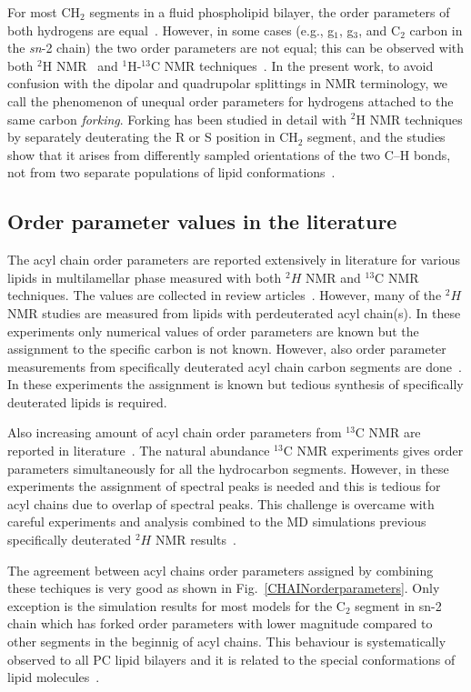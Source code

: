 \documentclass[aps,prl,superscriptaddress,twocolumn]{revtex4}
\begin{document}
For most CH$_2$ segments in a fluid phospholipid bilayer, the order parameters of both hydrogens are equal~\cite{seelig74,seelig77,seelig78}.
However, in some cases (e.g., g$_1$, g$_3$, and  C$_2$ carbon in the \textit{sn}-2 chain) the two order parameters are not equal;
this  can be observed with both $^2$H NMR~\cite{seelig75,seelig78,engel81,gally81} and $^1$H-$^{13}$C NMR techniques~\cite{??}. In the present work,
to avoid confusion with the dipolar and quadrupolar splittings in NMR terminology,
we call the phenomenon of unequal order parameters for hydrogens attached to the same carbon {\it forking}. 
Forking has been studied in detail with $^2$H NMR techniques by separately deuterating the R or S position in CH$_2$ segment, and
the studies show that it arises from differently sampled orientations of the two C--H bonds, not from two 
separate populations of lipid conformations~\cite{engel81,gally81}.

\subsection{Order parameter values in the literature}
The acyl chain order parameters are reported extensively in literature for various lipids
in multilamellar phase measured with both $^2H$ NMR and $^{13}$C NMR techniques.
The values are collected in review articles~\cite{leftin11,marsh13}. However, many of the $^2H$ NMR 
studies are measured from lipids with perdeuterated acyl chain(s). In these experiments only numerical
values of order parameters are known but the assignment to the specific carbon is not known.
However, also order parameter measurements from specifically deuterated acyl chain carbon segments 
are done~\cite{seelig74,seelig75,seelig77,seelig78}. In these experiments the assignment is known
but tedious synthesis of specifically deuterated lipids is required.

Also increasing amount of acyl chain order parameters from $^{13}$C NMR are reported in literature~\cite{leftin11,marsh13,ferreira13,??}.
The natural abundance $^{13}$C NMR experiments gives order parameters simultaneously for all the hydrocarbon 
segments. However, in these experiments the assignment of spectral peaks is needed and this is tedious
for acyl chains due to overlap of spectral peaks. This challenge is overcame with careful experiments
and analysis combined to the MD simulations previous specifically deuterated $^2H$ NMR results~\cite{ferreira13,??}.

The agreement between acyl chains order parameters assigned by combining these techiques is very good as shown in Fig.~\ref{CHAINorderparameters}.
Only exception is the simulation results for most models for the C$_2$ segment in sn-2 chain which has forked order parameters
with lower magnitude compared to other segments in the beginnig of acyl chains. This behaviour is systematically observed
to all PC lipid bilayers and it is related to the special conformations of lipid molecules~\cite{??}. 
\end{document}

